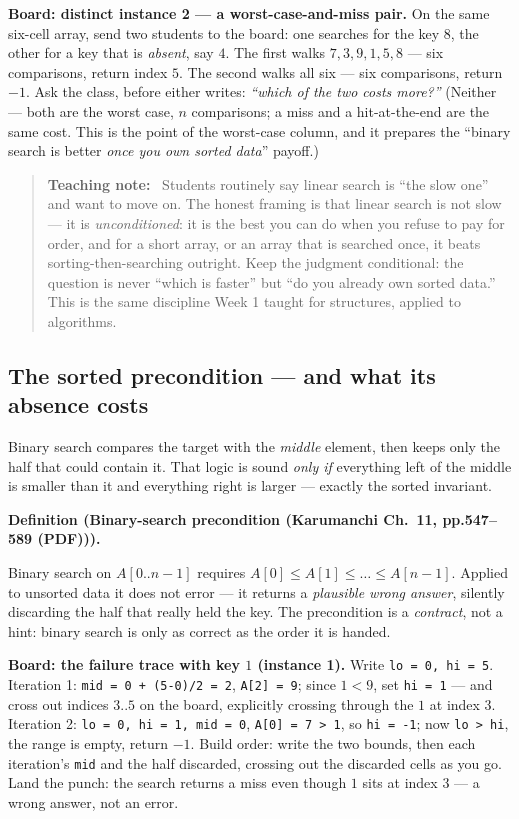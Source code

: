 \documentclass[11pt]{article}
\newenvironment{definitionbox}[1]{%
  \par\noindent\textbf{Definition (#1).}\ \itshape
}{\par\vspace{0.3em}}
\newenvironment{teachingaside}{\begin{quote}\small\color{primary-gold}\textbf{Teaching note:}\ }{\end{quote}}
\begin{document}
\textbf{Board: distinct instance 2 --- a worst-case-and-miss pair.} On the same six-cell array, send two students to the board: one searches for the key $8$, the other for a key that is \emph{absent}, say $4$. The first walks $7,3,9,1,5,8$ --- six comparisons, return index $5$. The second walks all six --- six comparisons, return $-1$. Ask the class, before either writes: \emph{``which of the two costs more?''} (Neither --- both are the worst case, $n$ comparisons; a miss and a hit-at-the-end are the same cost. This is the point of the worst-case column, and it prepares the ``binary search is better \emph{once you own sorted data}'' payoff.)

\begin{teachingaside}
Students routinely say linear search is ``the slow one'' and want to move on. The honest framing is that linear search is not slow --- it is \emph{unconditioned}: it is the best you can do when you refuse to pay for order, and for a short array, or an array that is searched once, it beats sorting-then-searching outright. Keep the judgment conditional: the question is never ``which is faster'' but ``do you already own sorted data.'' This is the same discipline Week 1 taught for structures, applied to algorithms.
\end{teachingaside}

\subsection{The sorted precondition --- and what its absence costs}

Binary search compares the target with the \emph{middle} element, then keeps only the half that could contain it. That logic is sound \emph{only if} everything left of the middle is smaller than it and everything right is larger --- exactly the sorted invariant.

\begin{definitionbox}{Binary-search precondition (Karumanchi Ch.~11, pp.547--589 (PDF))}
Binary search on $A[0..n-1]$ requires $A[0] \le A[1] \le \dots \le A[n-1]$. Applied to unsorted data it does not error --- it returns a \emph{plausible wrong answer}, silently discarding the half that really held the key. The precondition is a \emph{contract}, not a hint: binary search is only as correct as the order it is handed.
\end{definitionbox}

\textbf{Board: the failure trace with key $1$ (instance 1).} Write \texttt{lo = 0, hi = 5}. Iteration 1: \texttt{mid = 0 + (5-0)/2 = 2}, \texttt{A[2] = 9}; since $1 < 9$, set \texttt{hi = 1} --- and cross out indices $3..5$ on the board, explicitly crossing through the $1$ at index $3$. Iteration 2: \texttt{lo = 0, hi = 1, mid = 0}, \texttt{A[0] = 7 > 1}, so \texttt{hi = -1}; now \texttt{lo > hi}, the range is empty, return $-1$. Build order: write the two bounds, then each iteration's \texttt{mid} and the half discarded, crossing out the discarded cells as you go. Land the punch: the search returns a miss even though $1$ sits at index $3$ --- a wrong answer, not an error.
\end{document}
